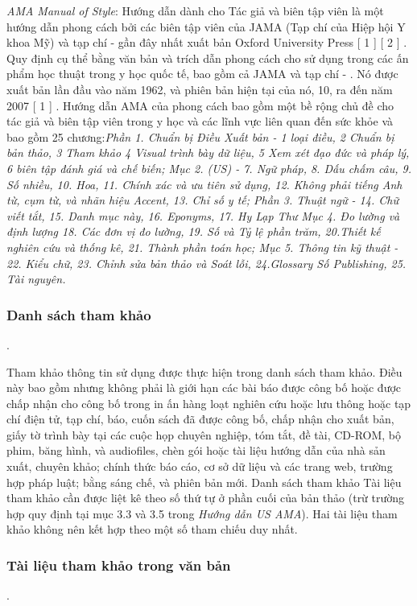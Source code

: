 \documentclass{hcmutarticle}
\begin{document}
{\em AMA Manual of Style}: Hướng dẫn dành cho Tác giả và biên tập viên là một hướng dẫn phong cách bởi các biên tập viên của JAMA (Tạp chí của Hiệp hội Y khoa Mỹ) và tạp chí - gần đây nhất xuất bản Oxford University Press [ 1 ] [ 2 ] . Quy định cụ thể bằng văn bản và trích dẫn phong cách cho sử dụng trong các ấn phẩm học thuật trong y học quốc tế, bao gồm cả JAMA và tạp chí - . Nó được xuất bản lần đầu vào năm 1962, và phiên bản hiện tại của nó, 10, ra đến năm 2007 [ 1 ] . Hướng dẫn AMA của phong cách bao gồm một bề rộng chủ đề cho tác giả và biên tập viên trong y học và các lĩnh vực liên quan đến sức khỏe và bao gồm 25 chương:{\em Phần 1. Chuẩn bị Điều Xuất bản - 1 loại điều, 2 Chuẩn bị bản thảo, 3 Tham khảo 4 Visual trình bày dữ liệu, 5 Xem xét đạo đức và pháp lý, 6 biên tập đánh giá và chế biến; Mục 2. (US) - 7. Ngữ pháp, 8. Dấu chấm câu, 9. Số nhiều, 10. Hoa, 11. Chính xác và ưu tiên sử dụng, 12. Không phải tiếng Anh từ, cụm từ, và nhãn hiệu Accent, 13. Chỉ số y tế; Phần 3. Thuật ngữ - 14. Chữ viết tắt, 15. Danh mục này, 16. Eponyms, 17. Hy Lạp Thư Mục 4. Đo lường và định lượng 18. Các đơn vị đo lường, 19. Số và Tỷ lệ phần trăm, 20.Thiết kế nghiên cứu và thống kê, 21. Thành phần toán học; Mục 5. Thông tin kỹ thuật - 22. Kiểu chữ, 23. Chỉnh sửa bản thảo và Soát lỗi, 24.Glossary Số Publishing, 25. Tài nguyên.}
\subsubsection{Danh sách tham khảo}.

Tham khảo thông tin sử dụng được thực hiện trong danh sách tham khảo. Điều này bao gồm nhưng không phải là giới hạn các bài báo được công bố hoặc được chấp nhận cho công bố trong in ấn hàng loạt nghiên cứu hoặc lưu thông hoặc tạp chí điện tử, tạp chí, báo, cuốn sách đã được công bố, chấp nhận cho xuất bản, giấy tờ trình bày tại các cuộc họp chuyên nghiệp, tóm tắt, đề tài, CD-ROM, bộ phim, băng hình, và audiofiles, chèn gói hoặc tài liệu hướng dẫn của nhà sản xuất, chuyên khảo; chính thức báo cáo, cơ sở dữ liệu và các trang web, trường hợp pháp luật; bằng sáng chế, và phiên bản mới. Danh sách tham khảo Tài liệu tham khảo cần được liệt kê theo số thứ tự ở phần cuối của bản thảo (trừ trường hợp quy định tại mục 3.3 và 3.5 trong {\itshape Hướng dẫn US AMA}). Hai tài liệu tham khảo không nên kết hợp theo một số tham chiếu duy nhất.

\subsubsection{Tài liệu tham khảo trong văn bản}.
\end{document}

